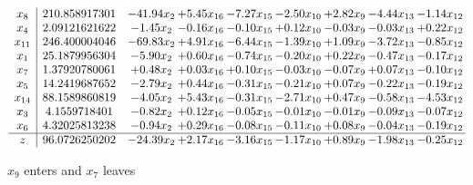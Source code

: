 \documentclass[9pt]{article}
\begin{document}
 \[\begin{array}{c| c c@{\hskip 2pt} c@{\hskip 2pt} c@{\hskip 2pt} c@{\hskip 2pt} c@{\hskip 2pt} c@{\hskip 2pt} c@{\hskip 2pt} }
 x_{8}   &  210.858917301 & -41.94 x_{2} & +  5.45 x_{16} & -7.27 x_{15} & -2.50 x_{10} & +  2.82 x_{9} & -4.44 x_{13} & -1.14 x_{12}\\
 x_{4}   &  2.09121621622 & -1.45 x_{2} & -0.16 x_{16} & -0.10 x_{15} & +  0.12 x_{10} & -0.03 x_{9} & -0.03 x_{13} & +  0.22 x_{12}\\
 x_{11}   &  246.400004046 & -69.83 x_{2} & +  4.91 x_{16} & -6.44 x_{15} & -1.39 x_{10} & +  1.09 x_{9} & -3.72 x_{13} & -0.85 x_{12}\\
 x_{1}   &  25.1879956304 & -5.90 x_{2} & +  0.60 x_{16} & -0.74 x_{15} & -0.20 x_{10} & +  0.22 x_{9} & -0.47 x_{13} & -0.17 x_{12}\\
 x_{7}   &  1.37920780061 & +  0.48 x_{2} & +  0.03 x_{16} & +  0.10 x_{15} & -0.03 x_{10} & -0.07 x_{9} & +  0.07 x_{13} & -0.10 x_{12}\\
 x_{5}   &  14.2419687652 & -2.79 x_{2} & +  0.44 x_{16} & -0.31 x_{15} & -0.21 x_{10} & +  0.07 x_{9} & -0.22 x_{13} & -0.19 x_{12}\\
 x_{14}   &  88.1589860819 & -4.05 x_{2} & +  5.43 x_{16} & -0.31 x_{15} & -2.71 x_{10} & +  0.47 x_{9} & -0.58 x_{13} & -4.53 x_{12}\\
 x_{3}   &  4.1559718401 & -0.82 x_{2} & +  0.12 x_{16} & -0.05 x_{15} & -0.01 x_{10} & -0.01 x_{9} & -0.09 x_{13} & -0.07 x_{12}\\
 x_{6}   &  4.32025813238 & -0.94 x_{2} & +  0.29 x_{16} & -0.08 x_{15} & -0.11 x_{10} & +  0.08 x_{9} & -0.04 x_{13} & -0.19 x_{12}\\
\hline
z    &  96.0726250202 & -24.39 x_{2} & +  2.17 x_{16} & -3.16 x_{15} & -1.17 x_{10} & +  0.89 x_{9} & -1.98 x_{13} & -0.25 x_{12}\\
\end{array}\]


 $ x_{9} $ enters and $ x_{7} $ leaves 
\end{document}
